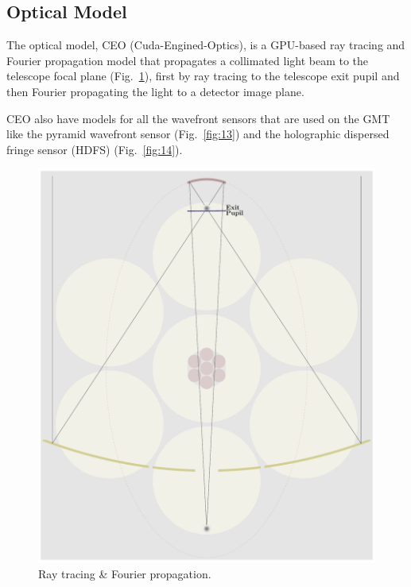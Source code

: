 \documentclass[]{AO4ELT}  %
\begin{document}
\clearpage

\subsection{Optical Model}
\label{sec:optics}

The optical model, CEO (Cuda-Engined-Optics), is a GPU-based ray tracing and Fourier propagation model that propagates a collimated light beam to the telescope focal plane (Fig.~\ref{fig:12}),
first by ray tracing to the telescope exit pupil and then Fourier propagating the light to a detector image plane.

CEO also have models for all the wavefront sensors that are used on the GMT like the pyramid wavefront sensor (Fig.~\ref{fig:13}) and the holographic dispersed fringe sensor (HDFS) (Fig.~\ref{fig:14}).


\begin{figure}
   \centering
   \includegraphics[width=0.6\linewidth]{ray_tracing.pdf}
   \caption{Ray tracing \& Fourier propagation.}
   \label{fig:12}
\end{figure}
\end{document}
